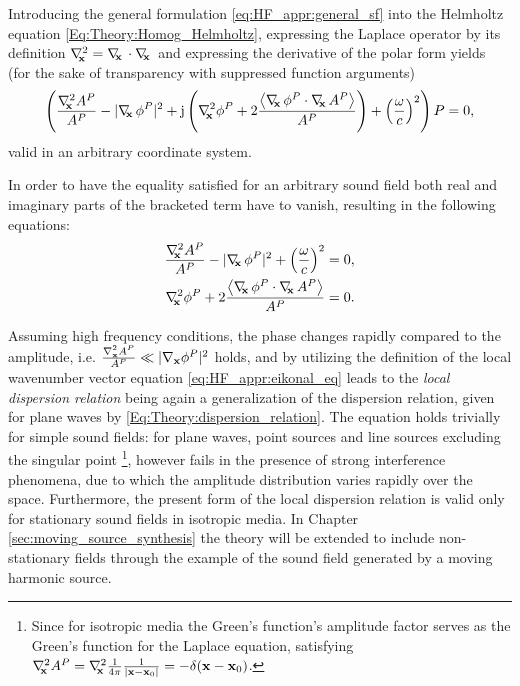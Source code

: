 Introducing the general formulation \eqref{eq:HF_appr:general_sf} into the Helmholtz equation \eqref{Eq:Theory:Homog_Helmholtz}, expressing the Laplace operator by its definition $\nabla^2_{\!\!\mathbf{x}} = \nabla_{\!\!\mathbf{x}}\, \cdot \nabla_{\!\!\mathbf{x}}\,$ and expressing the derivative of the polar form yields (for the sake of transparency with suppressed function arguments)
\begin{equation}
\left( 
\frac{\Lx A^P}{A^P} 
- 
| \Dx \phi^P |^2
+ 
\ti \left(  
\Lx \phi^P
+ 2\frac{ \left< \Dx \phi^P \cdot \Dx A^P \right> }{A^P} 
\right)
+ \left(\frac{\omega}{c}\right)^2 
\right) 
P = 0,
\label{eq:HF_appr:ray_tracing_helmholtz}
\end{equation}
valid in an arbitrary coordinate system.

In order to have the equality satisfied for an arbitrary sound field both real and imaginary parts of the bracketed term have to vanish, resulting in the following equations:
\begin{eqnarray} \label{eq:HF_appr:eikonal_eq}
\frac{\Lx A^P}{A^P}  - | \Dx \phi^P |^2 + \left(\frac{\omega}{c}\right)^2 = 0, \\ 
\label{eq:HF_appr:transport_eq}
\Lx \phi^P + 2\frac{ \left< \Dx \phi^P \cdot \Dx A^P \right> }{A^P} = 0.
\end{eqnarray}

Assuming high frequency conditions, the phase changes rapidly compared to the amplitude, i.e. $\frac{\nabla^2_{\mathbf{x}} A^P}{A^P} \ll | \nabla_{\mathbf{x}} \phi^P |^2$ holds, 
and by utilizing the definition of the local wavenumber vector equation \eqref{eq:HF_appr:eikonal_eq} leads to the \emph{local dispersion relation}
being again a generalization of the dispersion relation, given for plane waves by \eqref{Eq:Theory:dispersion_relation}.
%
The equation holds trivially for simple sound fields: for plane waves, point sources and line sources excluding the singular point \footnote{Since for isotropic media the Green's function's amplitude factor serves as the Green's function for the Laplace equation, satisfying $\nabla^2_{\!\!\mathbf{x}} A^P = \nabla^2_{\!\!\mathbf{x}} \frac{1}{4\pi} \frac{1}{|\mathbf{x}-\mathbf{x}_0|} = -\delta(\mathbf{x}-\mathbf{x}_0)$.}, however fails in the presence of strong interference phenomena, due to which the amplitude distribution varies rapidly over the space.
Furthermore, the present form of the local dispersion relation is valid only for stationary sound fields in isotropic media.
In Chapter \ref{sec:moving_source_synthesis} the theory will be extended to include non-stationary fields through the example of the sound field generated by a moving harmonic source.

